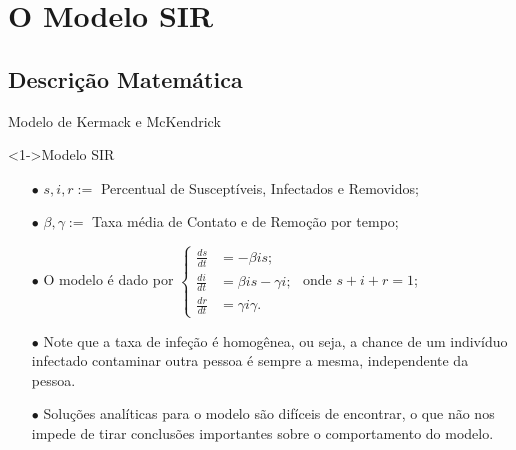 \documentclass{beamer}
\theoremstyle{plain}
\theoremstyle{definition}
\begin{document}
\section{O Modelo SIR}
\subsection{Descrição Matemática}
\begin{frame}{Modelo de Kermack e McKendrick}

    \begin{exampleblock}
        <1->{Modelo SIR}
        \begin{itemize}
            \item [$\bullet$] $s,i,r :=$ Percentual de Susceptíveis, Infectados e Removidos;
            \item [$\bullet$] $\beta, \gamma := $ Taxa média de Contato e de Remoção por tempo;
            \item [$\bullet$] O modelo é dado por
                $ 
                \begin{cases}
                    \frac{ds}{dt} &= -\beta i s; \\ 
                    \frac{di}{dt} &= \beta i s - \gamma i;  \\
                    \frac{dr}{dt} &= \gamma i \gamma. 
                \end{cases}
                $ 
                onde $s + i + r = 1$;
            \item [$\bullet$] Note que a taxa de infeção é homogênea, ou seja, a chance de um indivíduo
                infectado contaminar outra pessoa é sempre a mesma, independente da pessoa. 
            \item [$\bullet$] Soluções analíticas para o modelo são difíceis de encontrar, o que não 
                nos impede de tirar conclusões importantes sobre o comportamento do modelo.

        \end{itemize}

    \end{exampleblock} 
    
\end{frame}



\end{document}
